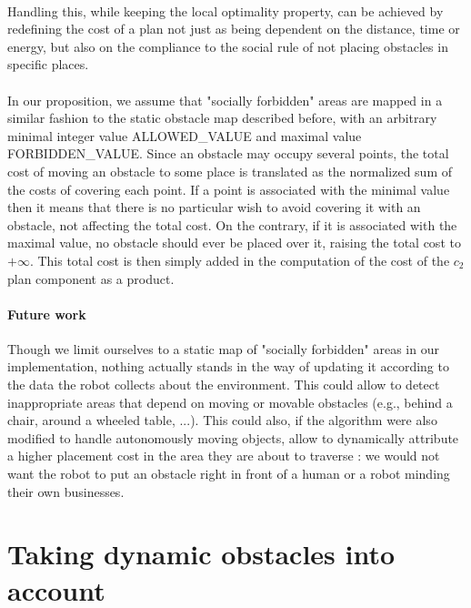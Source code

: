 \paragraph{} Handling this, while keeping the local optimality property, can be achieved by redefining the cost of a plan not just as being dependent on the distance, time or energy, but also on the compliance to the social rule of not placing obstacles in specific places.

\paragraph{} In our proposition, we assume that "socially forbidden" areas are mapped in a similar fashion to the static obstacle map described before, with an arbitrary minimal integer value ALLOWED\_VALUE and maximal value FORBIDDEN\_VALUE. Since an obstacle may occupy several points, the total cost of moving an obstacle to some place is translated as the normalized sum of the costs of covering each point. If a point is associated with the minimal value then it means that there is no particular wish to avoid covering it with an obstacle, not affecting the total cost. On the contrary, if it is associated with the maximal value, no obstacle should ever be placed over it, raising the total cost to $+\infty$. This total cost is then simply added in the computation of the cost of the $c_{2}$ plan component as a product.


\paragraph{Future work} Though we limit ourselves to a static map of "socially forbidden" areas in our implementation, nothing actually stands in the way of updating it according to the data the robot collects about the environment. This could allow to detect inappropriate areas that depend on moving or movable obstacles (e.g., behind a chair, around a wheeled table, ...). This could also, if the algorithm were also modified to handle autonomously moving objects, allow to dynamically attribute a higher placement cost in the area they are about to traverse : we would not want the robot to put an obstacle right in front of a human or a robot minding their own businesses.

\section{Taking dynamic obstacles into account}

